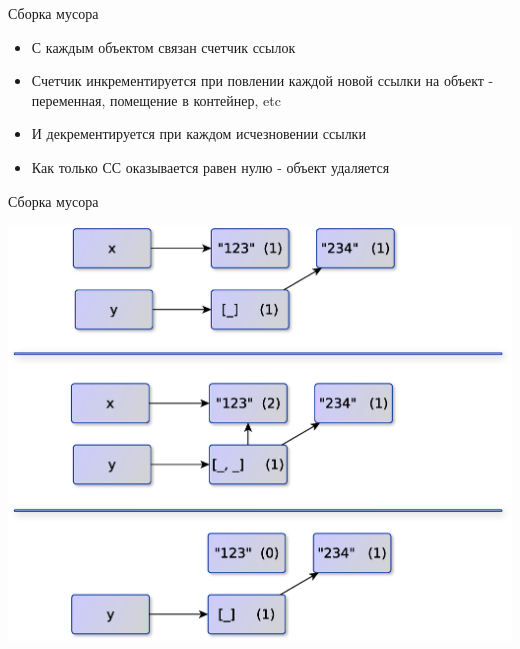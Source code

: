\documentclass{article}
\begin{document}
\begin{center} Сборка мусора \end{center}
\begin{itemize}
	\item С каждым объектом связан счетчик ссылок
	\item Счетчик инкрементируется при повлении каждой новой ссылки на объект -
	       переменная, помещение в контейнер, etc
	\item И декрементируется при каждом исчезновении ссылки
	\item Как только СС оказывается равен нулю - объект удаляется
\end{itemize}
\newpage

\begin{center} Сборка мусора \end{center}
\begin{center} \includegraphics[scale=0.6]{images/ref_counter.eps}\end{center}
\newpage
\end{document}
